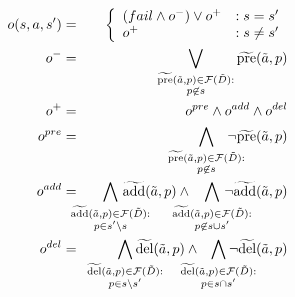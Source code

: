 \documentclass{article}
\begin{document}
\noindent \begin{eqnarray}
o(s, a, s') &=& \left\{ \begin{array}{ll}
(fail \wedge o^-) \vee  o^+  &: s = s'\\
o^+  & : s \not= s'
\end{array}\right. \label{eqn:update}\\
o^- &=& \bigvee\limits_{\substack{\widetilde{\text{pre}}(\tilde{a},p) \in {\cal F}(\tilde{D}):\\ p \not\in s} } \widetilde{\text{pre}}(\tilde{a},p) \label{eqn:update1} \\
o^+ &=& o^{pre} \wedge o^{add} \wedge o^{del}\label{eqn:update2}\\
o^{pre} &=& \bigwedge\limits_{\substack{\widetilde{\text{pre}}(\tilde{a},p) \in {\cal F}(\tilde{D}):\\ p \not\in s} }\hspace*{-0.5cm}\neg \widetilde{\text{pre}}(\tilde{a},p)\label{eqn:update3}  \\
o^{add} &=&  \hspace*{-.5cm}\bigwedge\limits_{\substack{\widetilde{\text{add}}(\tilde{a},p) \in {\cal F}(\tilde{D}):\\ p\in s'\backslash s} }\hspace*{-0.75cm}\widetilde{\text{add}}(\tilde{a},p)   \wedge  \hspace*{-0.5cm}\bigwedge\limits_{\substack{\widetilde{\text{add}}(\tilde{a},p) \in {\cal F}(\tilde{D}): \\ p \not\in  s\cup s'}} \hspace*{-0.75cm}\neg \widetilde{\text{add}}(\tilde{a},p)   \label{eqn:update4}\\
o^{del} &=& \hspace*{-.5cm} \bigwedge\limits_{\substack{\widetilde{\text{del}}(\tilde{a},p) \in {\cal F}(\tilde{D}): \\p \in s \backslash s'}} \hspace*{-0.75cm}\widetilde{\text{del}}(\tilde{a},p)  \wedge  \hspace*{-0.5cm}\bigwedge\limits_{\substack{\widetilde{\text{del}}(\tilde{a},p) \in {\cal F}(\tilde{D}):\\ p \in s\cap s'}} \hspace*{-0.75cm}\neg \widetilde{\text{del}}(\tilde{a},p)  \label{eqn:update5}
\end{eqnarray}
\end{document}
